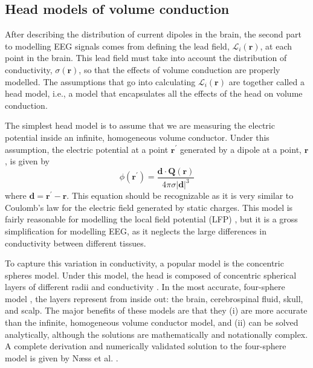 \subsection{Head models of volume conduction} \label{sec:head_models}
After describing the distribution of current dipoles in the brain, the second part to modelling EEG signals comes from defining the lead field, $\mathcal{L}_i(\bm{r})$, at each point in the brain. This lead field must take into account the distribution of conductivity, $\sigma(\bm{r})$, so that the effects of volume conduction are properly modelled. The assumptions that go into calculating $\mathcal{L}_i(\bm{r})$ are together called a head model, i.e., a model that encapsulates all the effects of the head on volume conduction.

The simplest head model is to assume that we are measuring the electric potential inside an infinite, homogeneous volume conductor. Under this assumption, the electric potential at a point $\bm{r}^\prime$ generated by a dipole at a point, $\bm{r}$, is given by
\begin{equation}
    \phi(\bm{r}^\prime) = \frac{\bm{d} \cdot \bm{Q}(\bm{r})}{4\pi\sigma |\bm{d}|^3}
\end{equation}
where $\bm{d}=\bm{r}^\prime-\bm{r}$. This equation should be recognizable as it is very similar to Coulomb's law for the electric field generated by static charges. This model is fairly reasonable for modelling the local field potential (LFP) \cite{Pettersen2012}, but it is a gross simplification for modelling EEG, as it neglects the large differences in conductivity between different tissues.

To capture this variation in conductivity, a popular model is the concentric spheres model. Under this model, the head is composed of concentric spherical layers of different radii and conductivity \cite{Geisler1961}. In the most accurate, four-sphere model \cite{Hosek1978}, the layers represent from inside out: the brain, cerebrospinal fluid, skull, and scalp. The major benefits of these models are that they (i) are more accurate than the infinite, homogeneous volume conductor model, and (ii) can be solved analytically, although the solutions are mathematically and notationally complex. A complete derivation and numerically validated solution to the four-sphere model is given by Næss et al. \cite{Næss2017}.

